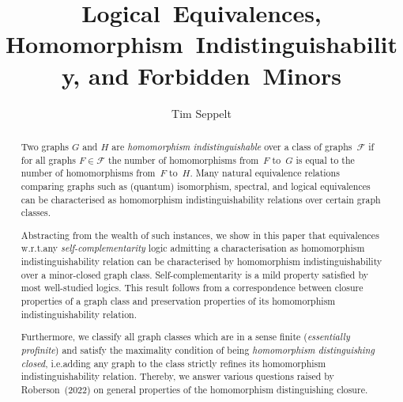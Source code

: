 \documentclass[3p,final]{elsarticle}
\begin{document}
	\begin{frontmatter}
		\title{Logical~Equivalences, Homomorphism~Indistinguishability, and Forbidden~Minors} %
		
		\author[1]{Tim Seppelt%
			}
		
		
	
	\begin{abstract}
		Two graphs $G$ and $H$ are \emph{homomorphism indistinguishable} over a class of graphs~$\mathcal{F}$ if for all graphs $F \in \mathcal{F}$ the number of homomorphisms from~$F$ to~$G$ is equal to the number of homomorphisms from~$F$ to~$H$.
		Many natural equivalence relations comparing graphs such as (quantum) isomorphism, spectral, and logical equivalences can be characterised as homomorphism indistinguishability relations over certain graph classes.
		
		Abstracting from the wealth of such instances, we show in this paper that equivalences w.r.t.\@ any \emph{self-complementarity} logic admitting a characterisation as homomorphism indistinguishability relation can be characterised by homomorphism indistinguishability over a minor-closed graph class.
		Self-complementarity is a mild property satisfied by most well-studied logics.
		This result follows from a correspondence between closure properties of a graph class and preservation properties of its homomorphism indistinguishability relation.
		
		Furthermore, we classify all graph classes which are in a sense finite (\emph{essentially profinite}) and satisfy the maximality condition of being \emph{homomorphism distinguishing closed}, i.e.\@ adding any graph to the class strictly refines its homomorphism indistinguishability relation.
		Thereby, we answer various questions raised by Roberson~(2022) on general properties of the homomorphism distinguishing closure.
	\end{abstract}
	
	\end{frontmatter}
\end{document}
